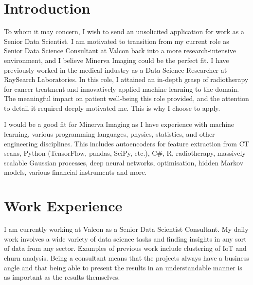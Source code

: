 \documentclass[10pt,a4paper,sans]{moderncv}
\newcommand{\company}{Minerva Imaging}
\begin{document}
\makecvtitle
\pagestyle{empty}

\section{Introduction}

To whom it may concern, I wish to send an unsolicited application for work as a Senior Data Scientist. I am motivated to transition from my current role as Senior Data Science Consultant at Valcon back into a more research-intensive environment, and I believe \company{} could be the perfect fit. I have previously worked in the medical industry as a Data Science Researcher at RaySearch Laboratories. In this role, I attained an in-depth grasp of radiotherapy for cancer treatment and innovatively applied machine learning to the domain. The meaningful impact on patient well-being this role provided, and the attention to detail it required deeply motivated me. This is why I choose to apply.

\hspace{7 mm} I would be a good fit for \company{} as I have experience with machine learning, various programming languages, physics, statistics, and other engineering disciplines. This includes autoencoders for feature extraction from CT scans, Python (TensorFlow, pandas, SciPy, etc.), C\#, R, radiotherapy, massively scalable Gaussian processes, deep neural networks, optimisation, hidden Markov models, various financial instruments and more.

\section{Work Experience}
I am currently working at Valcon as a Senior Data Scientist Consultant. My daily work involves a wide variety of data science tasks and finding insights in any sort of data from any sector. Examples of previous work include clustering of IoT and churn analysis. Being a consultant means that the projects always have a business angle and that being able to present the results in an understandable manner is as important as the results themselves.
\end{document}
